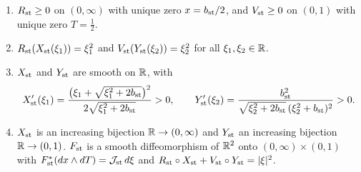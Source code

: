 \begin{lemma}\label{lem:str-morse-inverse}
\begin{enumerate}[label=(\roman*)]
\item $R_{\rm st}\ge0$ on $(0,\infty)$ with unique zero $x=b_{\rm st}/2$, and $V_{\rm st}\ge0$ on $(0,1)$ with unique zero
$T=\frac12$.
\item $R_{\rm st}(X_{\rm st}(\xi_1))=\xi_1^2$ and $V_{\rm st}(Y_{\rm st}(\xi_2))=\xi_2^2$ for all $\xi_1,\xi_2\in\mathbb{R}$.
\item $X_{\rm st}$ and $Y_{\rm st}$ are smooth on $\mathbb{R}$, with
\[
 X_{\rm st}'(\xi_1)=\frac{\big(\xi_1+\sqrt{\xi_1^2+2b_{\rm st}}\big)^2}{2\sqrt{\xi_1^2+2b_{\rm st}}}>0,\qquad
 Y_{\rm st}'(\xi_2)=\frac{b_{\rm st}^2}{\sqrt{\xi_2^2+2b_{\rm st}}\,(\xi_2^2+b_{\rm st})^2}>0 .
\]
\item $X_{\rm st}$ is an increasing bijection $\mathbb{R}\to(0,\infty)$ and $Y_{\rm st}$ an increasing bijection $\mathbb{R}\to(0,1)$.
$F_{\rm st}$ is a smooth diffeomorphism of $\mathbb{R}^2$ onto $(0,\infty)\times(0,1)$ with
$F_{\rm st}^*(dx\wedge dT)=\mathcal J_{\rm st}\,d\xi$ and $R_{\rm st}\circ X_{\rm st}+V_{\rm st}\circ Y_{\rm st}=|\xi|^2$.
\end{enumerate}
\end{lemma}

